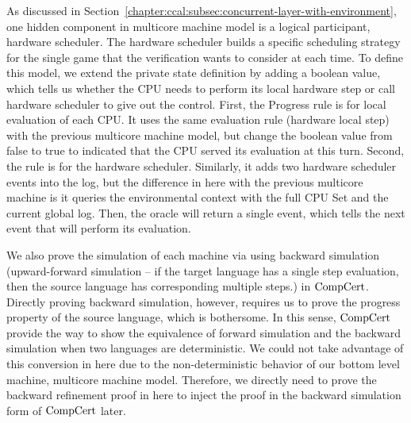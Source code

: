 As discussed in Section~\ref{chapter:ccal:subsec:concurrent-layer-with-environment}, 
one hidden component in multicore machine model is a logical participant, hardware scheduler. 
The hardware scheduler builds a specific scheduling strategy for the single game that the verification wants to consider at each time.  
To define this model, 
we extend the private state definition by adding a boolean value, which tells us whether the CPU needs to perform its local hardware step or call hardware scheduler to give out the control. 
First, the \textsf{Progress} rule is for local evaluation of each CPU. It uses the same evaluation rule (hardware local step) with the previous multicore machine model, 
but change the boolean value from false to true to indicated that the CPU served its evaluation at this turn. 
Second, the  rule is for the hardware scheduler.
Similarly, it adds two hardware scheduler events into the log, but the difference in here with the previous multicore machine is it queries the environmental context with the full CPU Set and the current global log. 
Then, the oracle will return a single event, which tells the next event that will perform its evaluation. 

We also prove the simulation of each machine via using backward simulation (upward-forward simulation -- if the target language
has a single step evaluation, then the source language has corresponding multiple steps.) 
in $\mathrm{CompCert}$. 
Directly proving backward simulation, however, requires us to prove the progress property of the source language, which is bothersome. 
In this sense, $\mathrm{CompCert}$ provide the way to show the equivalence of forward simulation and the backward simulation when 
two languages are deterministic.
We could not take advantage of this conversion in here due to the non-deterministic behavior of our bottom level machine,
multicore machine model. 
Therefore, we directly need to prove the backward refinement proof in here to inject the proof in the backward simulation form of $\mathrm{CompCert}$ later. 


